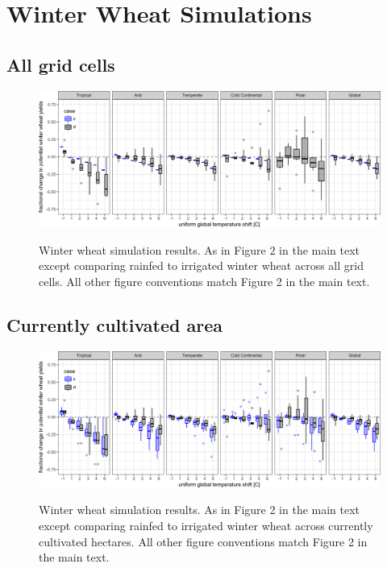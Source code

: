 \documentclass[10pt]{article}
\begin{document}
\clearpage
\section{Winter Wheat Simulations}
\subsection{All grid cells}
\begin{figure}[h!]
\includegraphics[width=\textwidth]{s_winter_wheat_sim_CG.png}\\
\caption{Winter wheat simulation results. As in Figure 2 in the main text except comparing rainfed to irrigated winter wheat across all grid cells. All other figure conventions match Figure 2 in the main text.}
\label{fig:maizeCG}
\end{figure}

\subsection{Currently cultivated area}
\begin{figure}[h!]
\includegraphics[width=\textwidth]{s_winter_wheat_sim_CG_area_weight.png}\\
\caption{Winter wheat simulation results. As in Figure 2 in the main text except comparing rainfed to irrigated winter wheat across currently cultivated hectares. All other figure conventions match Figure 2 in the main text.}
\label{fig:maizeCG}
\end{figure}
\end{document}
